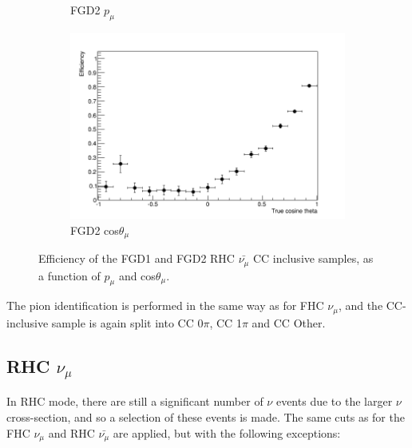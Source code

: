\begin{figure}[t]
\begin{subfigure}{.49\textwidth}
  \caption{FGD2 $p_{\mu}$}
\end{subfigure}
\begin{subfigure}{.49\textwidth}
  \centering
  \includegraphics[width=1.0\linewidth]{figs/effcosfgd2numubar}
  \caption{FGD2 cos$\theta_{\mu}$}
\end{subfigure}
\caption{Efficiency of the FGD1 and FGD2 RHC $\bar{\nu_{\mu}}$ CC inclusive samples, as a function of $p_{\mu}$ and cos$\theta_{\mu}$.}
\label{fig:numubareff}
\end{figure}

The pion identification is performed in the same way as for FHC $\nu_{\mu}$, and the CC-inclusive sample is again split into CC 0$\pi$, CC 1$\pi$ and CC Other.

\subsection{RHC $\nu_{\mu}$}

In RHC mode, there are still a significant number of $\nu$ events due to the larger $\nu$ cross-section, and so a selection of these events is made. The same cuts as for the FHC $\nu_{\mu}$ and RHC $\bar{\nu_{\mu}}$ are applied, but with the following exceptions:


